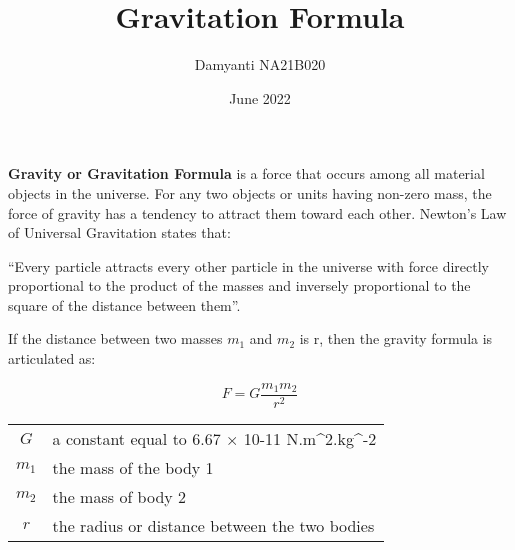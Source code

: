 \documentclass{article}
\title{\textbf{Gravitation Formula}}
\date{June 2022}
\author{Damyanti NA21B020}
\begin{document}
  \maketitle
\large
\paragraph{} \textbf{Gravity or Gravitation Formula} is a force that occurs among all material objects in the universe. For any two objects or units having non-zero mass, the force of gravity has a tendency to attract them toward each other. Newton’s Law of Universal Gravitation states that:

“Every particle attracts every other particle in the universe with force directly proportional to the product of the masses and inversely proportional to the square of the distance between them”.

If the distance between two masses $m_{1}$ and $m_{2}$ is r, then the gravity formula is articulated as:

\vspace{1cm}


\boldmath
\begin{equation}
  F=G\frac{{m_1}{m_2}}{{r^2}}
\end{equation}

\vspace{1cm}

\begin{tabular}{|c|l|}
    \hline
    $G$ & a constant equal to 6.67 × 10-11 N.m^{2}.kg^{-2}\\
    $m_{1}$ & the mass of the body 1\\
    $m_{2}$ & the mass of body 2\\
    $r$ & the radius or distance between the two bodies\\
    \hline
\end{tabular}
\end{document}

